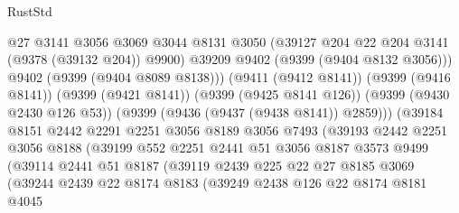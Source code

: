 \begin{lexlean}{RustStd}
\begin{coremodule}
                              @27
                              @3141
                              @3056
                              @3069
                              @3044
                              @8131
                              @3050
                              (@39127 @204 @22 @204 @3141 (@9378 (@39132 @204)) @9900)
                              @39209
                              @9402
                              (@9399 (@9404 @8132 @3056)))
                            @9402
                            (@9399 (@9404 @8089 @8138)))
                          (@9411 (@9412 @8141))
                          (@9399 (@9416 @8141))
                          (@9399 (@9421 @8141))
                          (@9399 (@9425 @8141 @126))
                          (@9399 (@9430 @2430 @126 @53))
                          (@9399 (@9436 (@9437 (@9438 @8141)) @2859)))
                        (@39184
                          @8151
                          @2442
                          @2291
                          @2251
                          @3056
                          @8189
                          @3056
                          @7493
                          (@39193
                            @2442
                            @2251
                            @3056
                            @8188
                            (@39199
                              @552
                              @2251
                              @2441
                              @51
                              @3056
                              @8187
                              @3573
                              @9499
                              (@39114
                                @2441
                                @51
                                @8187
                                (@39119
                                  @2439
                                  @225
                                  @22
                                  @27
                                  @8185
                                  @3069
                                  (@39244
                                    @2439
                                    @22
                                    @8174
                                    @8183
                                    (@39249
                                      @2438
                                      @126
                                      @22
                                      @8174
                                      @8181
                                      @4045

\end{coremodule}
\end{lexlean}
